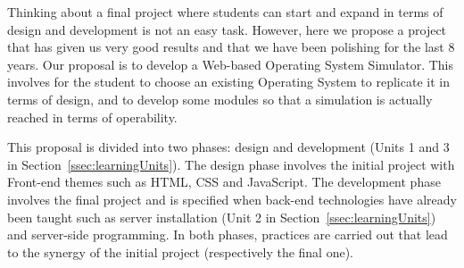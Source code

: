 Thinking about a final project where students can start and expand in terms of design 
and development is not an easy task. However, here we propose a project that has given 
us very good results and that we have been polishing for the last 8 years. 
Our proposal is to develop a Web-based Operating System Simulator. This involves for 
the student to choose an existing Operating System to replicate it in terms of design, 
and to develop some modules so that a simulation is actually reached in terms of 
operability. 

This proposal is divided into two phases: design and development (Units 1 and 3 in 
Section~\ref{ssec:learningUnits}). 
The design phase involves the initial project with Front-end themes such as HTML, 
CSS and JavaScript. 
The development phase involves the final project and is specified when back-end 
technologies have already been taught such as server installation (Unit 2 in 
Section~\ref{ssec:learningUnits}) and server-side programming. 
In both phases, practices are carried out that lead to the synergy of the initial 
project (respectively the final one).




